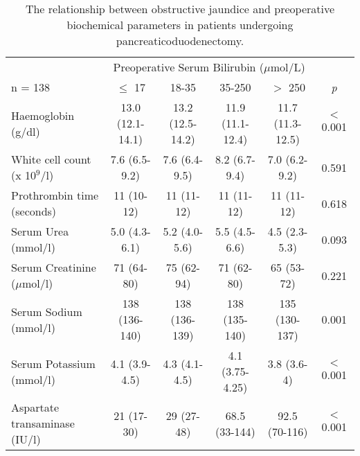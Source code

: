 	\begin{sidewaystable}[p]
		\caption{The relationship between obstructive jaundice and preoperative biochemical parameters in patients undergoing pancreaticoduodenectomy. }
		\label{table:cpet_oj_bloods}
		\centering
		\renewcommand{\arraystretch}{1.4} %
		\setlength{\tabcolsep}{9pt} %
		
		\begin{tabular}{| l | c c c c c|}
			\hline
			                                  &       \multicolumn{4}{c}{Preoperative Serum Bilirubin ($\mu$mol/L)}       &  \\
			n = 138                           & $\leq$ 17        & 18-35            & 35-250           & $>$ 250          & \textit{p} \\ \hline
			Haemoglobin (g/dl)                & 13.0 (12.1-14.1) & 13.2 (12.5-14.2) & 11.9 (11.1-12.4) & 11.7 (11.3-12.5) & $<$0.001   \\
			White cell count (x 10$^9$/l)     & 7.6 (6.5-9.2)    & 7.6 (6.4-9.5)    & 8.2 (6.7-9.4)    & 7.0 (6.2-9.2)    & 0.591      \\
			Prothrombin time (seconds)        & 11 (10-12)       & 11 (11-12)       & 11 (11-12)       & 11 (11-12)       & 0.618      \\
			Serum Urea (mmol/l)               & 5.0 (4.3-6.1)    & 5.2 (4.0-5.6)    & 5.5 (4.5-6.6)    & 4.5 (2.3-5.3)    & 0.093      \\
			Serum Creatinine ($\mu$mol/l)     & 71 (64-80)       & 75 (62-94)       & 71 (62-80)       & 65 (53-72)       & 0.221      \\
			Serum Sodium (mmol/l)             & 138 (136-140)    & 138 (136-139)    & 138 (135-140)    & 135 (130-137)    & 0.001      \\
			Serum Potassium (mmol/l)          & 4.1 (3.9-4.5)    & 4.3 (4.1-4.5)    & 4.1 (3.75-4.25)  & 3.8 (3.6-4)      & $<$0.001   \\
			Aspartate transaminase (IU/l)     & 21 (17-30)       & 29 (27-48)       & 68.5 (33-144)    & 92.5 (70-116)    & $<$0.001   \\

\end{tabular}
\end{sidewaystable}
